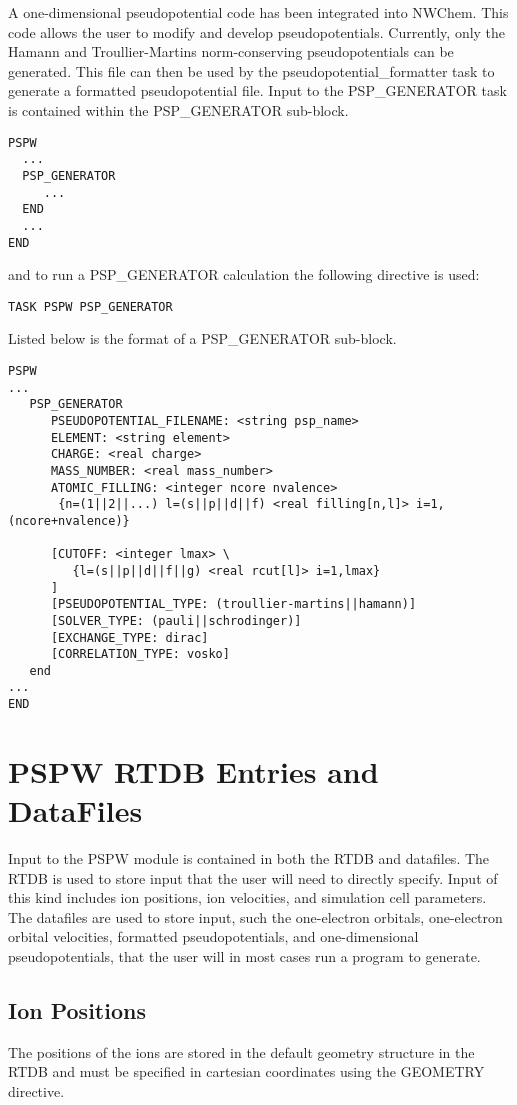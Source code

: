 A one-dimensional pseudopotential code has been integrated into NWChem.
This code allows the user to modify and develop pseudopotentials.  Currently, 
only the Hamann and Troullier-Martins norm-conserving pseudopotentials can be
generated.  This file can then be used by the pseudopotential\_formatter 
task to generate a formatted pseudopotential file. 
Input to the PSP\_GENERATOR task is contained
within the PSP\_GENERATOR sub-block.
\begin{verbatim}
PSPW
  ...
  PSP_GENERATOR
     ...
  END
  ...
END
\end{verbatim}
and to run a PSP\_GENERATOR calculation the following directive 
is used:
\begin{verbatim}
TASK PSPW PSP_GENERATOR
\end{verbatim}
Listed below is the format of a PSP\_GENERATOR sub-block.
\begin{verbatim}
PSPW
... 
   PSP_GENERATOR
      PSEUDOPOTENTIAL_FILENAME: <string psp_name>
      ELEMENT: <string element>
      CHARGE: <real charge>
      MASS_NUMBER: <real mass_number>
      ATOMIC_FILLING: <integer ncore nvalence>
       {n=(1||2||...) l=(s||p||d||f) <real filling[n,l]> i=1,(ncore+nvalence)}
      
      [CUTOFF: <integer lmax> \
         {l=(s||p||d||f||g) <real rcut[l]> i=1,lmax}
      ]
      [PSEUDOPOTENTIAL_TYPE: (troullier-martins||hamann)]
      [SOLVER_TYPE: (pauli||schrodinger)]
      [EXCHANGE_TYPE: dirac]
      [CORRELATION_TYPE: vosko]
   end
... 
END
\end{verbatim}





\section{PSPW RTDB Entries and DataFiles}
\label{sec:pspw_data}
Input to the PSPW module is contained in both the RTDB and datafiles.
The RTDB is used to store input that the user will need to directly specify.
Input of this kind includes ion positions, ion velocities, and simulation cell
parameters.  The datafiles are used to store input, such the one-electron 
orbitals, one-electron orbital velocities, formatted pseudopotentials, 
and one-dimensional pseudopotentials, that the user will in most cases
run a program to generate.

\subsection{Ion Positions}
The positions of the ions are stored in the default geometry structure
in the RTDB and must be specified in cartesian 
coordinates using the GEOMETRY directive.

